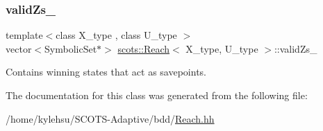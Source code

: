 \subsubsection{\texorpdfstring{valid\+Zs\+\_\+}{validZs\_}}
{\footnotesize\ttfamily template$<$class X\+\_\+type , class U\+\_\+type $>$ \\
vector$<$Symbolic\+Set$\ast$$>$ \hyperlink{classscots_1_1Reach}{scots\+::\+Reach}$<$ X\+\_\+type, U\+\_\+type $>$\+::valid\+Zs\+\_\+}

Contains winning states that act as savepoints. 

The documentation for this class was generated from the following file\+:\begin{DoxyCompactItemize}
\item 
/home/kylehsu/\+S\+C\+O\+T\+S-\/\+Adaptive/bdd/\hyperlink{Reach_8hh}{Reach.\+hh}\end{DoxyCompactItemize}
